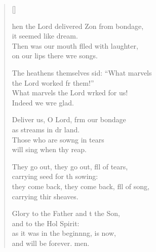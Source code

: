 \settowidth{\versewidth}{they come back, they come back, full of song, *}
\begin{verse}[\versewidth]
  \begin{patverse}
hen the Lord delivered Z\pointup{\i}on from bondage,\Med\\
it seemed like  dream.\\
Then was our mouth f\pointup{\i}lled with laughter,\Med\\
on our lips there wre songs.

The heathens themselves sid: “What marvels\Med\\
the Lord worked fr them!”\\
What marvels the Lord wrked for us!\Med\\
Indeed we wre glad.

Deliver us, O Lord, frm our bondage\Med\\
as streams in dr land.\\
Those who are sow\pointup{\i}ng in tears\Med\\
will sing when thy reap.

They go out, they go out, fll of tears,\Med\\
carrying seed for th sowing:\\
they come back, they come back, fll of song,\Med\\
carrying thir sheaves.

Glory to the Father and t the Son,\Med\\
and to the Hol Spirit:\\
as it was in the beginn\pointup{\i}ng, is now,\Med\\
and will be forever. men. 
  \end{patverse}
\end{verse}
